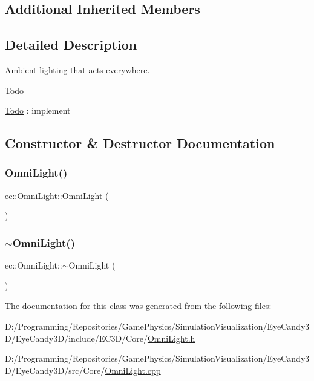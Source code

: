 \subsection*{Additional Inherited Members}


\subsection{Detailed Description}
Ambient lighting that acts everywhere. 

\begin{DoxyRefDesc}{Todo}
\item[\mbox{\hyperlink{todo__todo000003}{Todo}}]\+: implement \end{DoxyRefDesc}


\subsection{Constructor \& Destructor Documentation}
\mbox{\label{classec_1_1_omni_light_aa0240a42641c82a0363f569fdc312f23}} 
\subsubsection{\texorpdfstring{Omni\+Light()}{OmniLight()}}
{\footnotesize\ttfamily ec\+::\+Omni\+Light\+::\+Omni\+Light (\begin{DoxyParamCaption}{ }\end{DoxyParamCaption})\hspace{0.3cm}{\ttfamily [explicit]}}

\mbox{\label{classec_1_1_omni_light_a58c4d1aaf29e659c03ee1193cbca3eed}} 
\subsubsection{\texorpdfstring{$\sim$\+Omni\+Light()}{~OmniLight()}}
{\footnotesize\ttfamily ec\+::\+Omni\+Light\+::$\sim$\+Omni\+Light (\begin{DoxyParamCaption}{ }\end{DoxyParamCaption})\hspace{0.3cm}{\ttfamily [default]}}



The documentation for this class was generated from the following files\+:\begin{DoxyCompactItemize}
\item 
D\+:/\+Programming/\+Repositories/\+Game\+Physics/\+Simulation\+Visualization/\+Eye\+Candy3\+D/\+Eye\+Candy3\+D/include/\+E\+C3\+D/\+Core/\mbox{\hyperlink{_omni_light_8h}{Omni\+Light.\+h}}\item 
D\+:/\+Programming/\+Repositories/\+Game\+Physics/\+Simulation\+Visualization/\+Eye\+Candy3\+D/\+Eye\+Candy3\+D/src/\+Core/\mbox{\hyperlink{_omni_light_8cpp}{Omni\+Light.\+cpp}}\end{DoxyCompactItemize}
